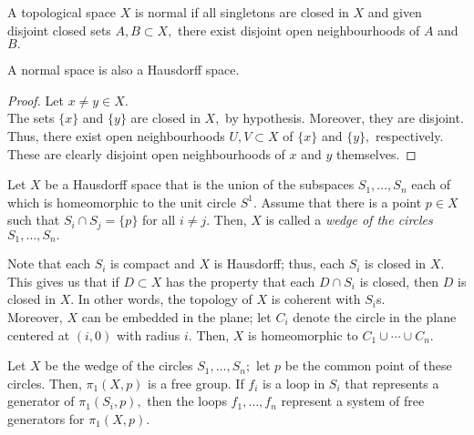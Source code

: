 \documentclass[12pt]{article}
\begin{document}
\begin{defn}
	A topological space $X$ is normal if all singletons are closed in $X$ and given disjoint closed sets $A, B \subset X,$ there exist disjoint open neighbourhoods of $A$ and $B.$
\end{defn}

\begin{lem} 
	A normal space is also a Hausdorff space.
\end{lem}
\begin{proof} 
	Let $x \neq y \in X.$\\
	The sets $\{x\}$ and $\{y\}$ are closed in $X,$ by hypothesis. Moreover, they are disjoint. Thus, there exist open neighbourhoods $U, V \subset X$ of $\{x\}$ and $\{y\},$ respectively. These are clearly disjoint open neighbourhoods of $x$ and $y$ themselves.
\end{proof}

\begin{defn}
	Let $X$ be a Hausdorff space that is the union of the subspaces $S_1, \ldots, S_n$ each of which is homeomorphic to the unit circle $S^1.$ Assume that there is a point $p \in X$ such that $S_i \cap S_j = \{p\}$ for all $i \neq j.$ Then, $X$ is called a \emph{wedge of the circles} $S_1, \ldots, S_n.$
\end{defn}

Note that each $S_i$ is compact and $X$ is Hausdorff; thus, each $S_i$ is closed in $X.$ This gives us that if $D \subset X$ has the property that each $D \cap S_i$ is closed, then $D$ is closed in $X.$ In other words, the topology of $X$ is coherent with $S_i$s. \\
Moreover, $X$ can be embedded in the plane; let $C_i$ denote the circle in the plane centered at $(i, 0)$ with radius $i.$ Then, $X$ is homeomorphic to $C_1 \cup \cdots \cup C_n.$

\begin{thm} \label{thm:fundgroupfinitwedgecircles}
	Let $X$ be the wedge of the circles $S_1, \ldots, S_n;$ let $p$ be the common point of these circles. Then, $\pi_1(X, p)$ is a free group. If $f_i$ is a loop in $S_i$ that represents a generator of $\pi_1(S_i, p),$ then the loops $f_1, \ldots, f_n$ represent a system of free generators for $\pi_1(X, p).$
\end{thm}
\end{document}
